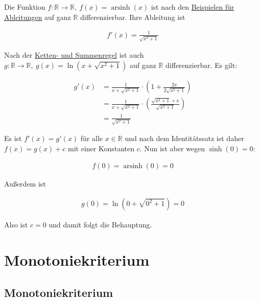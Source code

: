\documentclass[fontsize=9pt,
               parskip=half-,
               DIV=14,
               listof=chapterentry,
               tocflat]{scrbook}
\begin{document}
\begin{proof*}
Die Funktion $f:\mathbb {R} \to \mathbb {R} ,\ f(x)=\operatorname {arsinh} (x)$ ist nach den \href{https://de.wikibooks.org/wiki/Mathe\_für\_Nicht-Freaks:\_Beispiele\_für\_Ableitungen}
{Beispielen für Ableitungen} auf ganz $\mathbb {R} $ differenzierbar. Ihre Ableitung ist

\begin{align*}
f'(x)={\frac {1}{\sqrt {x^{2}+1}}}
\end{align*}

Nach der \href{https://de.wikibooks.org/wiki/Mathe\_für\_Nicht-Freaks:\_Ableitungsregeln:\_Kettenregel,\_Quotientenregel,\_Produktregel,\_Summenregel,\_Faktorregel}
{Ketten- und Summenregel} ist auch $g:\mathbb {R} \to \mathbb {R} ,\ g(x)=\ln \left(x+{\sqrt {x^{2}+1}}\right)$ auf ganz $\mathbb {R} $ differenzierbar. Es gilt:

\begin{align*}
g'(x)&={\frac {1}{x+{\sqrt {x^{2}+1}}}}\cdot \left(1+{\frac {2x}{2{\sqrt {x^{2}+1}}}}\right)\\[0.3em]&={\frac {1}{x+{\sqrt {x^{2}+1}}}}\cdot \left({\frac {{\sqrt {x^{2}+1}}+x}{\sqrt {x^{2}+1}}}\right)\\[0.3em]&={\frac {1}{\sqrt {x^{2}+1}}}
\end{align*}

Es ist $f'(x)=g'(x)$ für alle $x\in \mathbb {R} $ und nach dem Identitätssatz ist daher $f(x)=g(x)+c$ mit einer Konstanten $c$. Nun ist aber wegen $\sinh(0)=0$:

\begin{align*}
f(0)=\operatorname {arsinh} (0)=0
\end{align*}

Außerdem ist

\begin{align*}
g(0)=\ln \left(0+{\sqrt {0^{2}+1}}\right)=0
\end{align*}

Also ist $c=0$ und damit folgt die Behauptung.

\end{proof*}

\chapter{Monotoniekriterium}

\section{Monotoniekriterium}
\end{document}
